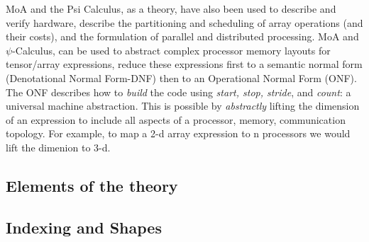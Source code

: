 MoA and the Psi Calculus, as a theory,  have  also been used to describe and verify 
hardware\cite{hardy1,hardy2,fftharry}, describe the partitioning and
scheduling of array operations (and their costs)\cite{mdst93,lee95,aachen96,coffin94,ll2,mcmahon95,haleh98}, 
and the formulation of parallel and distributed processing\cite{Mul03}. 
MoA and $\psi$-Calculus, can be used to abstract complex processor memory layouts 
for tensor/array expressions, reduce these expressions first to a semantic 
normal form (Denotational Normal Form-DNF) then to an Operational Normal Form 
(ONF). The ONF describes how to {\em build} the code using 
{\em start, stop, stride}, and {\em count}: a universal machine abstraction.
This is possible by {\em abstractly} lifting the dimension of an expression to include all aspects
of a processor, memory, communication topology. For example, to map a 2-d array expression to
n  processors we would lift the dimenion to 3-d. 
%
%
%
%
%
\subsection*{Elements of the theory}
\subsection*{\label{indshp} Indexing and Shapes}

